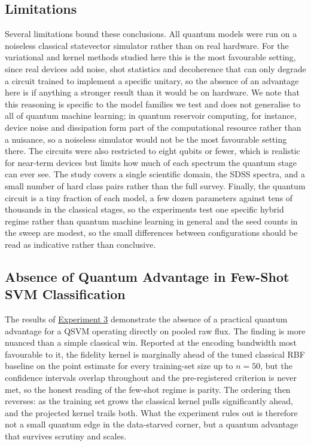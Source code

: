 \subsection{Limitations}
\label{sec:limitations}

Several limitations bound these conclusions. All quantum models were run on a noiseless
classical statevector simulator rather than on real hardware. For the variational and
kernel methods studied here this is the most favourable setting, since real devices add
noise, shot statistics and decoherence that can only degrade a circuit trained to
implement a specific unitary, so the absence of an advantage here is if anything a
stronger result than it would be on hardware. We note that this reasoning is specific to
the model families we test and does not generalise to all of quantum machine learning;
in quantum reservoir computing, for instance, device noise and dissipation form part of
the computational resource rather than a nuisance, so a noiseless simulator would not be
the most favourable setting there. The
circuits were also restricted to eight qubits or fewer, which is realistic for
near-term devices but limits how much of each spectrum the quantum stage can ever see.
The study covers a single scientific domain, the SDSS spectra, and a small number of
hard class pairs rather than the full survey. Finally, the quantum circuit is a tiny
fraction of each model, a few dozen parameters against tens of thousands in the
classical stages, so the experiments test one specific hybrid regime rather than
quantum machine learning in general and the seed counts in the sweep are modest, so
the small differences between configurations should be read as indicative rather than
conclusive.


\subsection{Absence of Quantum Advantage in Few-Shot SVM Classification}
The results of \hyperref[sec:exp3_results]{Experiment 3} demonstrate the absence of a
practical quantum advantage for a QSVM operating directly on pooled raw flux. The finding
is more nuanced than a simple classical win. Reported at the encoding bandwidth most
favourable to it, the fidelity kernel is marginally ahead of the tuned classical RBF
baseline on the point estimate for every training-set size up to $n = 50$, but the
confidence intervals overlap throughout and the pre-registered criterion is never met, so
the honest reading of the few-shot regime is parity. The ordering then reverses: as the
training set grows the classical kernel pulls significantly ahead, and the projected
kernel trails both. What the experiment rules out is therefore not a small quantum edge in
the data-starved corner, but a quantum advantage that survives scrutiny and scales.

